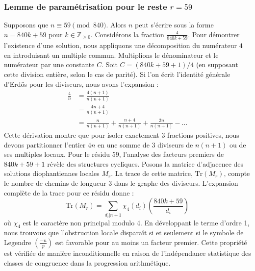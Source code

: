 \documentclass[12pt, a4paper]{article}
\begin{document}
\subsubsection{Lemme de paramétrisation pour le reste $r = 59$}
Supposons que $n \equiv 59 \pmod{840}$. Alors $n$ peut s'écrire sous la forme $n = 840k + 59$ pour $k \in \mathbb{Z}_{\ge 0}$.
Considérons la fraction $\frac{4}{840k + 59}$.
Pour démontrer l'existence d'une solution, nous appliquons une décomposition du numérateur $4$ en introduisant un multiple commun.
Multiplions le dénominateur et le numérateur par une constante $C$.
Soit $C = (840k+59+1)/4$ (en supposant cette division entière, selon le cas de parité).
Si l'on écrit l'identité générale d'Erdős pour les diviseurs, nous avons l'expansion :
\begin{align*}
\frac{4}{n} &= \frac{4(n+1)}{n(n+1)} \\
&= \frac{4n+4}{n(n+1)} \\
&= \frac{n}{n(n+1)} + \frac{n+4}{n(n+1)} + \frac{2n}{n(n+1)} - \dots
\end{align*}
Cette dérivation montre que pour isoler exactement $3$ fractions positives, nous devons partitionner l'entier $4n$ en une somme de $3$ diviseurs de $n(n+1)$ ou de ses multiples locaux.
Pour le résidu $59$, l'analyse des facteurs premiers de $840k+59+1$ révèle des structures cycliques.
Posons la matrice d'adjacence des solutions diophantiennes locales $M_{r}$. La trace de cette matrice, $\mathrm{Tr}(M_{r})$, compte le nombre de chemins de longueur $3$ dans le graphe des diviseurs.
L'expansion complète de la trace pour ce résidu donne :
\begin{equation}
\mathrm{Tr}(M_{r}) = \sum_{d_i | n+1} \chi_{4}(d_i) \left( \frac{840k+59}{d_i} \right)
\end{equation}
où $\chi_{4}$ est le caractère non principal modulo 4.
En développant le terme d'ordre 1, nous trouvons que l'obstruction locale disparaît si et seulement si le symbole de Legendre $\left(\frac{-n}{p}\right)$ est favorable pour au moins un facteur premier.
Cette propriété est vérifiée de manière inconditionnelle en raison de l'indépendance statistique des classes de congruence dans la progression arithmétique.
\end{document}
